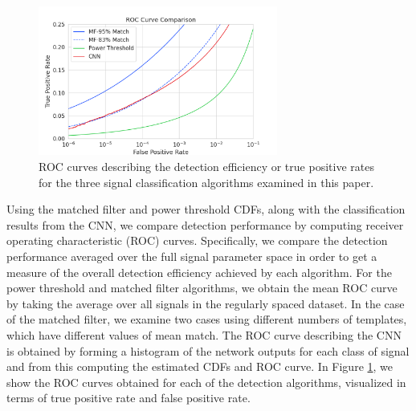 \begin{figure}[htbp]
    \centering
    \includegraphics[width=0.7\textwidth]{figs/Chapter-4/230327_nn_roc_vs_mf_vs_fft.png}
    \caption{ROC curves describing the detection efficiency or true positive rates for the three signal classification algorithms examined in this paper.
    }
    \label{fig:roc_compare}
\end{figure}
Using the matched filter and power threshold CDFs, along with the classification results from the CNN, we compare detection performance by computing receiver operating characteristic (ROC) curves. Specifically, we compare the detection performance averaged over the full signal parameter space in order to get a measure of the overall detection efficiency achieved by each algorithm. For the power threshold and matched filter algorithms, we obtain the mean ROC curve by taking the average over all signals in the regularly spaced dataset. In the case of the matched filter, we examine two cases using different numbers of templates, which have different values of mean match. The ROC curve describing the CNN is obtained by forming a histogram of the network outputs for each class of signal and from this computing the estimated CDFs and ROC curve. In Figure \ref{fig:roc_compare}, we show the ROC curves obtained for each of the detection algorithms, visualized in terms of true positive rate and false positive rate.

